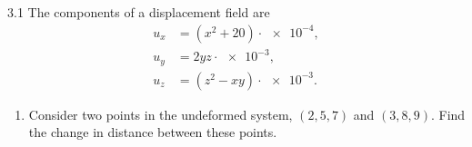 
\begin{problem}{3.1}
  The components of a displacement field are
  \begin{align*}
    u_x &= \left( x^2 + 20 \right)\cdot \num{e-4} , \\
    u_y &= 2yz \cdot \num{e-3}  ,\\
    u_z &= \left( z^2 - xy \right) \cdot \num{e-3} 
  .\end{align*}

  \begin{enumerate}[label=(\alph*)]
    \item Consider two points in the undeformed system, $(2,5,7)$ and $(3,8,9)$.
      Find the change in distance between these points.
  \end{enumerate}
\end{problem}

